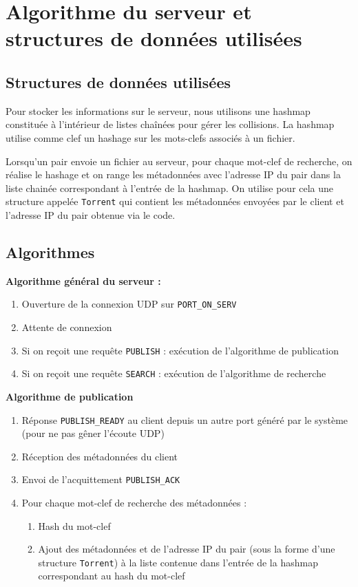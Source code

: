 \section{Algorithme du serveur et structures de données utilisées}
\label{algoServ}

\subsection{Structures de données utilisées}
Pour stocker les informations sur le serveur, nous utilisons une hashmap constituée à l'intérieur de listes chaînées pour gérer les collisions. La hashmap utilise comme 
clef un hashage sur les mots-clefs associés à un fichier.

Lorsqu'un pair envoie un fichier au serveur, pour chaque mot-clef de recherche, on réalise le hashage et on range 
les métadonnées avec l'adresse IP du pair dans la liste chainée correspondant à l'entrée de la hashmap. On utilise pour cela une structure appelée \texttt{Torrent} qui contient 
les métadonnées envoyées par le client et l'adresse IP du pair obtenue via le code.


\subsection{Algorithmes}
\noindent \textbf{Algorithme général du serveur :}

\begin{enumerate}
	\item Ouverture de la connexion UDP sur \texttt{PORT\_ON\_SERV}
	\item Attente de connexion
	\item Si on reçoit une requête \texttt{PUBLISH} : exécution de l'algorithme de publication
	\item Si on reçoit une requête \texttt{SEARCH} : exécution de l'algorithme de recherche
\end{enumerate}

\noindent \textbf{Algorithme de publication}

\begin{enumerate}
	\item Réponse \texttt{PUBLISH\_READY} au client depuis un autre port généré par le système (pour ne pas gêner l'écoute UDP)
	\item Réception des métadonnées du client
	\item Envoi de l'acquittement \texttt{PUBLISH\_ACK}
	\item Pour chaque mot-clef de recherche des métadonnées :
		\begin{enumerate}
			\item Hash du mot-clef
			\item Ajout des métadonnées et de l'adresse IP du pair (sous la forme d'une structure \texttt{Torrent}) à la liste contenue dans l'entrée de la hashmap correspondant au hash du mot-clef
		\end{enumerate}
\end{enumerate}


